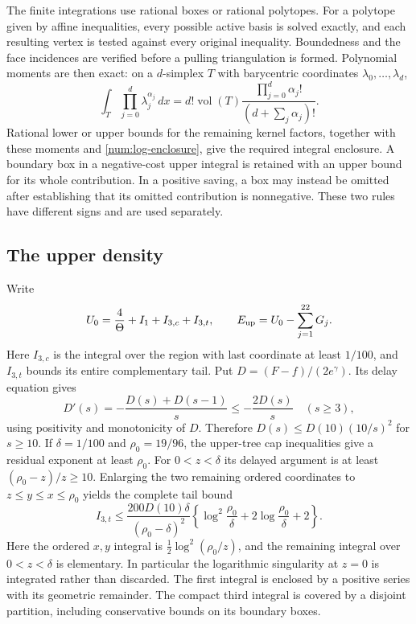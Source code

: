The finite integrations use rational boxes or rational polytopes.
For a polytope given by affine inequalities, every possible active
basis is solved exactly, and each resulting vertex is tested against
every original inequality.  Boundedness and the face incidences are
verified before a pulling triangulation is formed.  Polynomial
moments are then exact: on a $d$-simplex $T$ with barycentric
coordinates $\lambda_0,\ldots,\lambda_d$,
\begin{equation}
 \int_T\prod_{j=0}^d\lambda_j^{\alpha_j}\,dx
 =d!\operatorname{vol}(T)
   \frac{\prod_{j=0}^d\alpha_j!}{(d+\sum_j\alpha_j)!}.
 \label{num:simplex-moment}
\end{equation}
Rational lower or upper bounds for the remaining kernel factors,
together with these moments and \eqref{num:log-enclosure}, give the
required integral enclosure.  A boundary box in a negative-cost upper
integral is retained with an upper bound for its whole contribution.
In a positive saving, a box may instead be omitted after establishing
that its omitted contribution is nonnegative.  These two rules have
different signs and are used separately.

\subsection{The upper density}
Write
\[
 U_0=\frac4\Theta+I_1+I_{3,c}+I_{3,t},\qquad
 E_{\rm up}=U_0-\sum_{j=1}^{22}G_j.
\]
Here $I_{3,c}$ is the integral over the region with last coordinate
at least $1/100$, and $I_{3,t}$ bounds its entire complementary
tail.  Put $D=(F-f)/(2e^\gamma)$.  Its delay equation gives
\[
 D'(s)=-\frac{D(s)+D(s-1)}s\le-\frac{2D(s)}s
 \quad(s\ge3),
\]
using positivity and monotonicity of $D$.  Therefore
$D(s)\le D(10)(10/s)^2$ for $s\ge10$.  If
$\delta=1/100$ and $\rho_0=19/96$, the upper-tree cap
inequalities give a residual exponent at least $\rho_0$.
For $0<z<\delta$ its delayed argument is at least
$(\rho_0-z)/z\ge10$.  Enlarging the two remaining ordered
coordinates to $z\le y\le x\le\rho_0$ yields the complete
tail bound
\begin{equation}
 I_{3,t}\le
 \frac{200D(10)\delta}{(\rho_0-\delta)^2}
 \left\{\log^2\frac{\rho_0}{\delta}
        +2\log\frac{\rho_0}{\delta}+2\right\}.
 \label{num:complete-tail}
\end{equation}
Here the ordered $x,y$ integral is
$\tfrac12\log^2(\rho_0/z)$, and the remaining integral
over $0<z<\delta$ is elementary.  In particular the
logarithmic singularity at $z=0$ is integrated rather
than discarded.  The first integral is
enclosed by a positive series with its geometric remainder.
The compact third integral is covered by a disjoint partition,
including conservative bounds on its boundary boxes.

